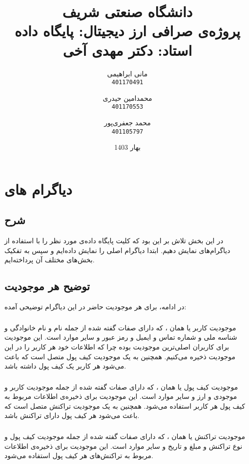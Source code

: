 \documentclass{book}
\title{{\normalsize{دانشگاه صنعتی شریف}} \\ \vspace{1cm}
    پروژه‌ی صرافی ارز دیجیتال: پایگاه داده \\ \large{استاد: دکتر مهدی آخی}}
\date{بهار 1403}
\author{
  مانی ابراهیمی\\
  \texttt{401170491}
  \and
  محمدامین حیدری\\
  \texttt{401170553}
  \and
  محمد جعفری‌پور\\
  \texttt{401105797}
}
\begin{document}
    \maketitle
    \newpage
    
    \tableofcontents
    \newpage

        \chapter{دیاگرام های }
        \section{شرح}
        در این بخش تلاش بر این بود که کلیت پایگاه داده‌ی مورد نظر را با استفاده از دیاگرام‌های  نمایش دهیم. ابتدا دیاگرام  اصلی را نمایش داده‌ایم و سپس به تفکیک بخش‌های مختلف آن پرداخته‌ایم.
        \section{توضیح هر موجودیت}
        در ادامه، برای هر موجودیت حاضر در این دیاگرام توضیحی آمده:

        \subsection{}
        موجودیت کاربر یا همان ، که دارای صفات گفته شده از جمله نام و نام خانوادگی و شناسه ملی و شماره تماس و ایمیل و رمز عبور و سایر موارد است. این موجودیت برای کاربران اصلی‌ترین موجودیت بوده چرا که اطلاعات خود هر کاربر را در این موجودیت ذخیره می‌کنیم. همچنین به یک موجودیت کیف پول متصل است که باعث می‌شود هر کاربر یک کیف پول داشته باشد.

        \subsection{}
        موجودیت کیف پول یا همان ، که دارای صفات گفته شده از جمله موجودیت کاربر و موجودی و ارز و سایر موارد است. این موجودیت برای ذخیره‌ی اطلاعات مربوط به کیف پول هر کاربر استفاده می‌شود. همچنین به یک موجودیت تراکنش متصل است که باعث می‌شود هر کیف پول دارای تراکنش باشد.

        \subsection{}
        موجودیت تراکنش یا همان ، که دارای صفات گفته شده از جمله موجودیت کیف پول و نوع تراکنش و مبلغ و تاریخ و سایر موارد است. این موجودیت برای ذخیره‌ی اطلاعات مربوط به تراکنش‌های هر کیف پول استفاده می‌شود.
\end{document}
